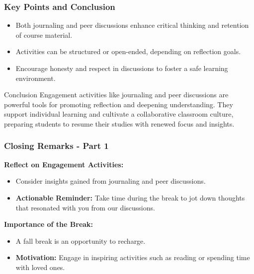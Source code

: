 \documentclass[aspectratio=169]{beamer}
\begin{document}
\begin{frame}[fragile]
    \frametitle{Key Points and Conclusion}
    \begin{itemize}
        \item Both journaling and peer discussions enhance critical thinking and retention of course material.
        \item Activities can be structured or open-ended, depending on reflection goals.
        \item Encourage honesty and respect in discussions to foster a safe learning environment.
    \end{itemize}
    
    \begin{block}{Conclusion}
        Engagement activities like journaling and peer discussions are powerful tools for promoting reflection and deepening understanding. They support individual learning and cultivate a collaborative classroom culture, preparing students to resume their studies with renewed focus and insights.
    \end{block}
\end{frame}

\begin{frame}[fragile]
    \frametitle{Closing Remarks - Part 1}
    
    \textbf{Reflect on Engagement Activities:}
    \begin{itemize}
        \item Consider insights gained from journaling and peer discussions.
        \item \textbf{Actionable Reminder:} Take time during the break to jot down thoughts that resonated with you from our discussions.
    \end{itemize}
    
    \textbf{Importance of the Break:}
    \begin{itemize}
        \item A fall break is an opportunity to recharge.
        \item \textbf{Motivation:} Engage in inspiring activities such as reading or spending time with loved ones.
    \end{itemize}
\end{frame}
\end{document}
